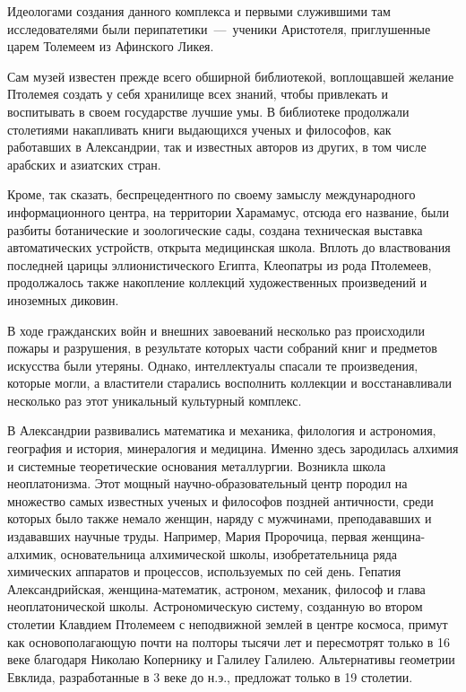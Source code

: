 Идеологами создания данного комплекса и первыми служившими там исследователями были перипатетики~---~ученики Аристотеля,
приглушенные царем Толемеем из Афинского Ликея. 

Сам музей известен прежде всего обширной библиотекой, воплощавшей желание Птолемея создать у себя хранилище всех знаний, чтобы привлекать и воспитывать в своем государстве лучшие умы. В библиотеке продолжали столетиями накапливать книги выдающихся ученых и философов, как работавших в Александрии, так и известных авторов из других, в том числе арабских и азиатских стран. 

Кроме, так сказать, беспрецедентного по своему замыслу международного информационного центра, на территории Харамамус, отсюда его название, были разбиты ботанические и зоологические сады, создана техническая выставка автоматических устройств, открыта медицинская школа. Вплоть до властвования последней царицы эллионистического Египта, Клеопатры из рода Птолемеев, продолжалось также накопление коллекций художественных произведений и иноземных диковин. 

В ходе гражданских войн и внешних завоеваний несколько раз происходили пожары и разрушения, в результате которых части собраний книг и предметов искусства были утеряны. Однако, интеллектуалы спасали те произведения, которые могли, а властители старались восполнить коллекции и восстанавливали несколько раз этот уникальный культурный комплекс. 

В Александрии развивались математика и механика, филология и астрономия, география и история, минералогия и медицина. Именно здесь зародилась алхимия и системные теоретические основания металлургии. 
Возникла школа неоплатонизма. Этот мощный научно-образовательный центр породил на множество самых известных ученых и философов поздней античности, среди которых было также немало женщин, наряду с мужчинами, преподававших и издававших научные труды. 
Например, Мария Пророчица, первая женщина-алхимик, основательница алхимической школы, изобретательница ряда химических аппаратов и процессов, используемых по сей день. 
Гепатия Александрийская, женщина-математик, астроном, механик, философ и глава неоплатонической школы. Астрономическую систему, созданную во втором столетии Клавдием Птолемеем с неподвижной землей в центре космоса, примут как основополагающую почти на полторы тысячи лет и пересмотрят только в 16 веке благодаря Николаю Копернику и Галилеу Галилею.  
Альтернативы геометрии Евклида, разработанные в 3 веке до н.э., предложат только в 19 столетии. 

